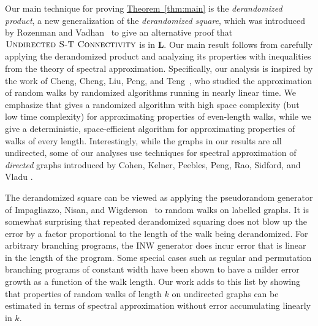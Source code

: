 \documentclass[11pt]{article}
\numberwithin{equation}{section}
\theoremstyle{definition}
\theoremstyle{plain}
\newcommand{\expref}[2]{\hyperref[#2]{#1~\ref{#2}}}
\newcommand{\class}[1]{\mathbf{#1}}
\renewcommand{\L}{\class{L}}
\def\textprob#1{\textmd{\textsc{#1}}}
\newcommand{\USTConn}{\textprob{Undirected S-T Connectivity}}
\numberwithin{myalgctr}{section}
\theoremstyle{named}
\begin{document}
Our main technique for proving \expref{Theorem}{thm:main} is the \emph{derandomized product}, a new generalization of the \emph{derandomized square}, which was introduced by Rozenman and Vadhan~\cite{RozenmanVa05} to give an alternative proof that $\USTConn$ is in $\L$. Our main result follows from carefully applying the derandomized product and analyzing its properties with inequalities from the theory of spectral approximation. Specifically, our analysis is inspired by the work of Cheng, Cheng, Liu, Peng, and Teng~\cite{cheng2015}, who studied the approximation of random walks by randomized algorithms running in nearly linear time. We emphasize that
%
%
\cite{cheng2015} gives a randomized algorithm with high space complexity (but low time complexity) for approximating properties of even-length walks, while we give a deterministic, space-efficient algorithm for approximating properties of walks of every length. Interestingly, while the graphs in our results are all undirected, some of our analyses use techniques for spectral approximation of \emph{directed} graphs introduced by Cohen, Kelner, Peebles, Peng, Rao, Sidford, and Vladu \cite{CKPPSV16,CKPPRSV16}. 

The derandomized square can be viewed as applying the pseudorandom generator of Impagliazzo, Nisan, and Wigderson~\cite{ImpagliazzoNiWi94} to random walks on labelled graphs. It is somewhat surprising that repeated derandomized squaring does not blow up the error by a factor proportional to the length of the walk being derandomized. For arbitrary branching programs, the INW generator does incur error that is linear in the length of the program. Some special cases such as  regular \cite{BravermanRaRaYe10, BrodyVe10, De11} and permutation \cite{De11, Steinke12} branching programs of constant width have been shown to have a milder error growth as a function of the walk length. Our work adds to this list by showing that properties of random walks of length $k$ on undirected graphs can be estimated in terms of spectral approximation without error accumulating linearly in $k$.
\end{document}

